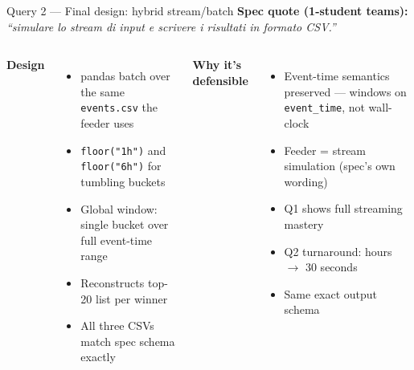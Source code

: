 \documentclass[aspectratio=169,10pt]{beamer}
\begin{document}
\begin{frame}{Query 2 — Final design: hybrid stream/batch}
\textbf{Spec quote (1-student teams):} \textit{``simulare lo stream di input e
scrivere i risultati in formato CSV.''}
\vspace{0.5em}

\begin{columns}[T,onlytextwidth]
{\color{sabdOrange}\textbf{Design}}
\begin{itemize}\small
  \item pandas batch over the same \texttt{events.csv} the feeder uses
  \item \texttt{floor("1h")} and \texttt{floor("6h")} for tumbling buckets
  \item Global window: single bucket over full event-time range
  \item Reconstructs top-20 list per winner
  \item All three CSVs match spec schema exactly
\end{itemize}

{\color{sabdNavy}\textbf{Why it's defensible}}
\begin{itemize}\small
  \item Event-time semantics preserved — windows on \texttt{event\_time}, not wall-clock
  \item Feeder = stream simulation (spec's own wording)
  \item Q1 shows full streaming mastery
  \item Q2 turnaround: hours $\to$ 30 seconds
  \item Same exact output schema
\end{itemize}
\end{columns}
\end{frame}
\end{document}
